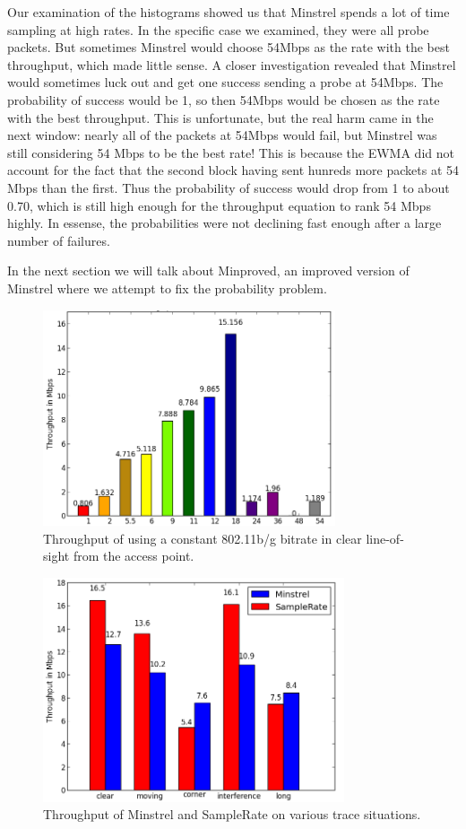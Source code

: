 \documentclass[letterpaper,twocolumn,10pt]{article}
\begin{document}
Our examination of the histograms showed us that Minstrel spends a lot of time sampling at high rates. In the specific case we examined, they were all probe packets. But sometimes Minstrel would choose 54Mbps as the rate with the best throughput, which made little sense. A closer investigation revealed that Minstrel would sometimes luck out and get one success sending a probe at 54Mbps. The probability of success would be 1, so then 54Mbps would be chosen as the rate with the best throughput. This is unfortunate, but the real harm came in the next window: nearly all of the packets at 54Mbps would fail, but Minstrel was still considering 54 Mbps to be the best rate! This is because the EWMA did not account for the fact that the second block having sent hunreds more packets at 54 Mbps than the first. Thus the probability of success would drop from 1 to about 0.70, which is still high enough for the throughput equation to rank 54 Mbps highly. In essense, the probabilities were not declining fast enough after a large number of failures.

In the next section we will talk about Minproved, an improved version of Minstrel where we attempt to fix the probability problem. 

\begin{figure}[htb]
  \hspace{-1em}\includegraphics[width=3.4in]{constant.png}\vspace{-0em}
  \caption{Throughput of using a constant 802.11b/g bitrate in clear line-of-sight from the access point.}
\label{figure:2}
\end{figure}


\begin{figure}[htb]
  \hspace{-.75em}\includegraphics[width=3.5in]{MinVSSam1.png}\vspace{-0.75em}
  \caption{Throughput of Minstrel and SampleRate on various trace situations.}
\label{figure:3}
\end{figure}
\end{document}
